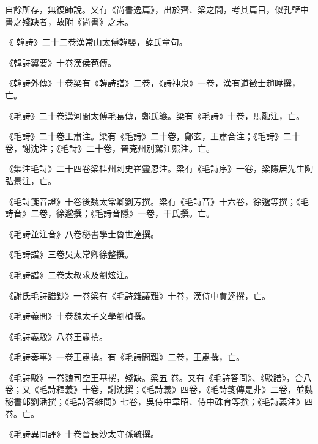 \begin{pinyinscope}
 自餘所存，無復師說。又有《尚書逸篇》，出於齊、梁之間，考其篇目，似孔壁中書之殘缺者，故附《尚書》之末。



 《
 韓詩》二十二卷漢常山太傅韓嬰，薛氏章句。



 《韓詩翼要》十卷漢侯苞傳。



 《韓詩外傳》十卷梁有《韓詩譜》二卷，《詩神泉》一卷，漢有道徵士趙曄撰，亡。



 《毛詩》二十卷漢河間太傅毛萇傳，鄭氏箋。梁有《毛詩》十卷，馬融注，亡。



 《毛詩》二十卷王肅注。梁有《毛詩》二十卷，鄭玄，王肅合注；《毛詩》二十卷，謝沈注；《毛詩》二十卷，晉兗州別駕江熙注。亡。



 《集注毛詩》二十四卷梁桂州刺史崔靈恩注。梁有《毛詩序》一卷，梁隱居先生陶弘景注，亡。



 《毛詩箋音證》十卷後魏太常卿劉芳撰。梁有《毛詩音》十六卷，徐邈等撰；《毛詩音》二卷，徐邈撰；《毛詩音隱》一卷，干氏撰。亡。



 《毛詩並注音》八卷秘書學士魯世達撰。



 《毛詩譜》三卷吳太常卿徐整撰。



 《毛詩譜》二卷太叔求及劉炫注。



 《謝氏毛詩譜鈔》一卷梁有《毛詩雜議難》十卷，漢侍中賈逵撰，亡。



 《毛詩義問》十卷魏太子文學劉楨撰。



 《毛詩義駁》八卷王肅撰。



 《毛詩奏事》一卷王肅撰。有《毛詩問難》二卷，王肅撰，亡。



 《毛詩駁》一卷魏司空王基撰，殘缺。梁五
 卷。又有《毛詩答問》、《駁譜》，合八卷；又《毛詩釋義》十卷，謝沈撰；《毛詩義》四卷，《毛詩箋傳是非》二卷，並魏秘書郎劉潘撰；《毛詩答雜問》七卷，吳侍中韋昭、侍中硃育等撰；《毛詩義注》四卷。亡。



 《毛詩異同評》十卷晉長沙太守孫毓撰。




\end{pinyinscope}
